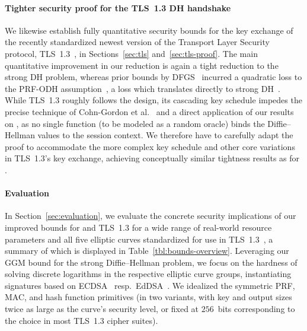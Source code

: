 \paragraph{Tighter security proof for the TLS~1.3 DH handshake}
We likewise establish fully quantitative security bounds for the key exchange of the recently standardized newest version of the Transport Layer Security protocol, TLS~1.3~\cite{rfc8446}, in Sections~\ref{sec:tls} and~\ref{sec:tls-proof}.
The main quantitative improvement in our reduction is again a tight reduction to the strong DH problem, whereas prior bounds by DFGS~\cite{JC:DFGS21} incurred a quadratic loss to the PRF-ODH assumption~\cite{C:JKSS12,C:BFGJ17}, a loss which translates directly to strong DH~\cite{C:BFGJ17}.
While TLS~1.3 roughly follows the \SIGMAI design, its cascading key schedule impedes the precise technique of Cohn-Gordon et al.~\cite{C:CCGJJ19} and a direct application of our results on \SIGMAI, as no single function (to be modeled as a random oracle) binds the Diffie--Hellman values to the session context.
We therefore have to carefully adapt the proof to accommodate the more complex key schedule and other core variations in TLS~1.3's key exchange, achieving conceptually similar tightness results as for \SIGMAI.


\paragraph{Evaluation}
In Section~\ref{sec:evaluation}, we evaluate the concrete security implications of our improved bounds for \SIGMA and TLS~1.3 for a wide range of real-world resource parameters and all five elliptic curves standardized for use in TLS~1.3~\cite{rfc8446},
a summary of which is displayed in Table~\ref{tbl:bounds-overview}.
\iffull
Leveraging our GGM bound for the strong Diffie--Hellman problem, we focus on the hardness of solving discrete logarithms in the respective elliptic curve groups, instantiating signatures based on ECDSA~\cite{NIST:FIPS-186-4} resp.\ EdDSA~\cite{CHES:BDLSY11}.
We idealized the symmetric PRF, MAC, and hash function primitives (in two variants, with key and output sizes twice as large as the curve's security level, or fixed at $256$~bits corresponding to the choice in most TLS~1.3 cipher suites).

